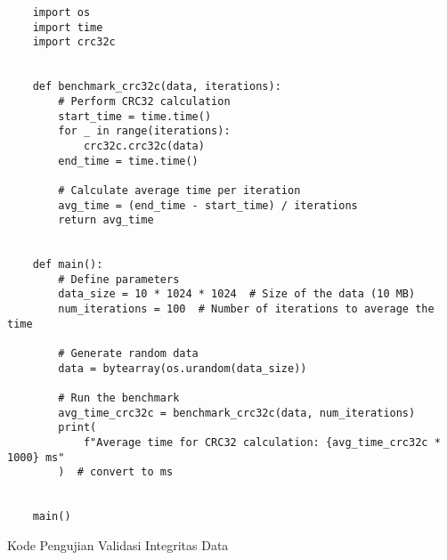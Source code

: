 \begin{listing}[H]
    \begin{verbatim}
    import os
    import time
    import crc32c


    def benchmark_crc32c(data, iterations):
        # Perform CRC32 calculation
        start_time = time.time()
        for _ in range(iterations):
            crc32c.crc32c(data)
        end_time = time.time()

        # Calculate average time per iteration
        avg_time = (end_time - start_time) / iterations
        return avg_time


    def main():
        # Define parameters
        data_size = 10 * 1024 * 1024  # Size of the data (10 MB)
        num_iterations = 100  # Number of iterations to average the time

        # Generate random data
        data = bytearray(os.urandom(data_size))

        # Run the benchmark
        avg_time_crc32c = benchmark_crc32c(data, num_iterations)
        print(
            f"Average time for CRC32 calculation: {avg_time_crc32c * 1000} ms"
        )  # convert to ms


    main()
    \end{verbatim}
    \caption{Kode Pengujian Validasi Integritas Data}
    \label{code:kode_pengujian_validasi_integritas_data}
\end{listing}


